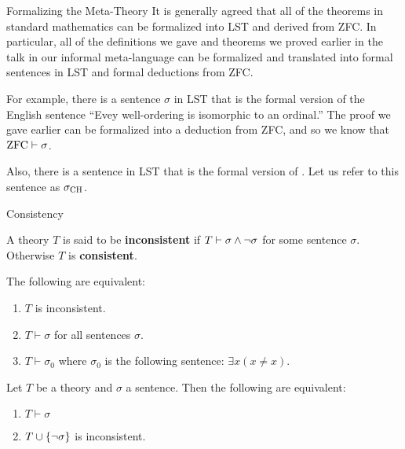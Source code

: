 \documentclass[pdf,final]{prosper}
\newcommand{\skipsmall}{\vspace{1em}}
\begin{document}
\begin{slide}{Formalizing the Meta-Theory}
It is generally agreed that all of the theorems in standard mathematics can be
formalized into LST and derived from ZFC. In particular,
all of the definitions we gave and theorems we proved earlier in the talk in our
informal meta-language can be formalized and translated into formal sentences
in LST and formal deductions from ZFC.

\skipsmall

For example, there is a sentence $\sigma$ in LST that is the formal version of
the English sentence ``Evey well-ordering is isomorphic to an ordinal.'' The
proof we gave earlier can be formalized into a deduction from ZFC, and so we
know that $\operatorname{ZFC}\vdash\sigma$.

\skipsmall

Also, there is a sentence in LST that is the formal version of \CH. Let
us refer to this sentence as $\operatorname{\sigma_{\text{CH}}}$. 


\end{slide}

\begin{slide}{Consistency}
\begin{definition}
A theory $T$ is said to be \textbf{inconsistent} if
$T\vdash\sigma\wedge\neg\sigma$ for some sentence $\sigma$. Otherwise $T$ is \textbf{consistent}.
\end{definition}

\skipsmall

\begin{remark}
The following are equivalent:
\begin{enumerate}
  \item $T$ is inconsistent.
  \item $T\vdash\sigma$ for all sentences $\sigma$.
  \item $T\vdash\sigma_0$ where $\sigma_0$ is the
following sentence: $\exists x(x\neq x)$.
\end{enumerate}

\end{remark}

\skipsmall

\begin{remark}
Let $T$ be a theory and $\sigma$ a sentence. Then the following are equivalent:
\begin{enumerate}
  \item $T\vdash\sigma$
  \item $T\cup\left\{\neg\sigma\right\}$ is inconsistent.
\end{enumerate}
\end{remark}
\end{slide}
\end{document}
